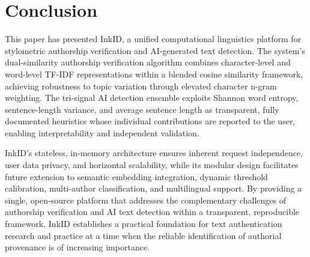 \documentclass[conference]{IEEEtran}
\begin{document}
\section{Conclusion}
\label{sec:conclusion}

This paper has presented InkID, a unified computational linguistics platform
for stylometric authorship verification and AI-generated text detection. The
system's dual-similarity authorship verification algorithm combines
character-level and word-level TF-IDF representations within a blended cosine
similarity framework, achieving robustness to topic variation through elevated
character n-gram weighting. The tri-signal AI detection ensemble exploits
Shannon word entropy, sentence-length variance, and average sentence length as
transparent, fully documented heuristics whose individual contributions are
reported to the user, enabling interpretability and independent validation.

InkID's stateless, in-memory architecture ensures inherent request
independence, user data privacy, and horizontal scalability, while its
modular design facilitates future extension to semantic embedding integration,
dynamic threshold calibration, multi-author classification, and multilingual
support. By providing a single, open-source platform that addresses the
complementary challenges of authorship verification and AI text detection
within a transparent, reproducible framework, InkID establishes a practical
foundation for text authentication research and practice at a time when the
reliable identification of authorial provenance is of increasing importance.




%
\end{document}
